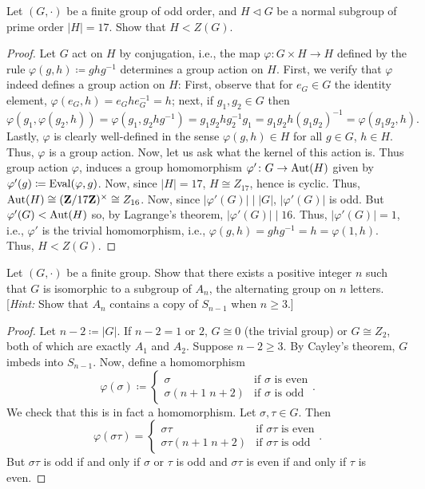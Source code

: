 \begin{problem}
Let $(G,\cdot)$ be a finite group of odd order, and $H\lhd G$ be a normal
subgroup of prime order $|H|=17$. Show that $H<Z(G)$.
\end{problem}
\begin{proof}
Let $G$ act on $H$ by conjugation, i.e., the map $\varphi\colon G\times
H\to H$ defined by the rule $\varphi(g,h)\coloneqq ghg^{-1}$ determines a
group action on $H$. First, we verify that $\varphi$ indeed defines a group
action on $H$: First, observe that for $e_G\in G$ the identity element,
$\varphi(e_G,h)=e_Ghe_G^{-1}=h$; next, if $g_1,g_2\in G$ then
\[
\varphi(g_1,\varphi(g_2,h))=\varphi(g_1,g_2hg^{-1})=g_1g_2hg_2^{-1}g_1=g_1g_2h(g_1g_2)^{-1}=\varphi(g_1g_2,h).
\]
Lastly, $\varphi$ is clearly well-defined in the sense $\varphi(g,h)\in H$
for all $g\in G$, $h\in H$. Thus, $\varphi$ is a group action. Now, let us
ask what the kernel of this action is. Thus group action $\varphi$, induces
a group homomorphism $\varphi'\colon G\to\operatorname{Aut}(H)$ given by
$\varphi'(g)\coloneqq\operatorname{Eval}(\varphi,g)$. Now, since $|H|=17$, $H\cong
Z_{17}$, hence is cyclic. Thus, $\operatorname{Aut}(H)\cong(\mathbf{Z}/17\mathbf{Z})^\times\cong
Z_{16}$. Now, since $|\varphi'(G)|\mid |G|$, $|\varphi'(G)|$ is odd. But
$\varphi'(G)<\operatorname{Aut}(H)$ so, by Lagrange's theorem, $|\varphi'(G)|\mid
16$. Thus, $|\varphi'(G)|=1$, i.e., $\varphi'$ is the trivial homomorphism,
i.e., $\varphi(g,h)=ghg^{-1}=h=\varphi(1,h)$. Thus, $H<Z(G)$.
\end{proof}
\begin{problem}
Let $(G,\cdot)$ be a finite group. Show that there exists a positive
integer $n$ such that $G$ is isomorphic to a subgroup of $A_n$, the
alternating group on $n$ letters. [\emph{Hint:} Show that $A_n$ contains a
copy of $S_{n-1}$ when $n\geq 3$.]
\end{problem}
\begin{proof}
Let $n-2\coloneqq |G|$. If $n-2=1$ or $2$, $G\cong 0$ (the trivial group) or
$G\cong Z_2$, both of which are exactly $A_1$ and $A_2$. Suppose $n-2\geq
3$. By Cayley's theorem, $G$ imbeds into $S_{n-1}$. Now, define a
homomorphism
\[
\varphi(\sigma)\coloneqq
\begin{cases}
\sigma&\text{if $\sigma$ is even}\\
\sigma(n+1\;n+2)&\text{if $\sigma$ is odd}
\end{cases}.
\]
We check that this is in fact a homomorphism. Let $\sigma,\tau\in G$. Then
\[
\varphi(\sigma\tau)=
\begin{cases}
\sigma\tau&\text{if $\sigma\tau$ is even}\\
\sigma\tau(n+1\;n+2)&\text{if $\sigma\tau$ is odd}
\end{cases}.
\]
But $\sigma\tau$ is odd if and only if $\sigma$ or $\tau$ is odd and
$\sigma\tau$ is even if and only if $\tau$ is even.
\end{proof}
